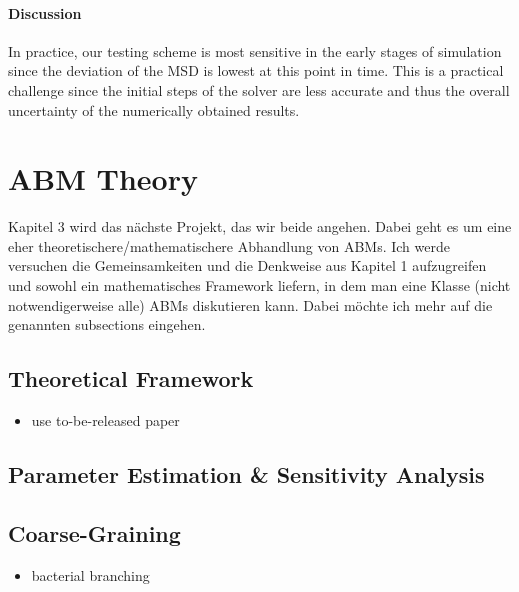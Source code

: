 \paragraph{Discussion}
In practice, our testing scheme is most sensitive in the early stages of simulation since the
deviation of the MSD is lowest at this point in time.
This is a practical challenge since the initial steps of the solver are less accurate and thus the
overall uncertainty of the numerically obtained results.

\pagebreak
\section{ABM Theory}

Kapitel 3 wird das nächste Projekt, das wir beide angehen. Dabei geht es um eine eher
theoretischere/mathematischere Abhandlung von ABMs. Ich werde versuchen die
Gemeinsamkeiten und die Denkweise aus Kapitel 1 aufzugreifen und sowohl ein
mathematisches Framework liefern, in dem man eine Klasse (nicht notwendigerweise alle)
ABMs diskutieren kann. Dabei möchte ich mehr auf die genannten subsections eingehen.

\subsection{Theoretical Framework}
\begin{itemize}
    \item use to-be-released paper
\end{itemize}

\subsection{Parameter Estimation \& Sensitivity Analysis}
\subsection{Coarse-Graining}
\begin{itemize}
    \item bacterial branching
\end{itemize}

